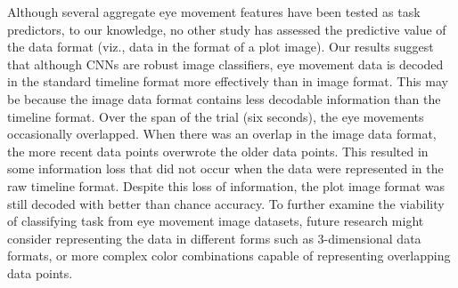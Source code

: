 \documentclass[
  english,
  man, donotrepeattitle,floatsintext]{apa6}
\begin{document}
Although several aggregate eye movement features have been tested as task predictors, to our knowledge, no other study has assessed the predictive value of the data format (viz., data in the format of a plot image). Our results suggest that although CNNs are robust image classifiers, eye movement data is decoded in the standard timeline format more effectively than in image format. This may be because the image data format contains less decodable information than the timeline format. Over the span of the trial (six seconds), the eye movements occasionally overlapped. When there was an overlap in the image data format, the more recent data points overwrote the older data points. This resulted in some information loss that did not occur when the data were represented in the raw timeline format. Despite this loss of information, the plot image format was still decoded with better than chance accuracy. To further examine the viability of classifying task from eye movement image datasets, future research might consider representing the data in different forms such as 3-dimensional data formats, or more complex color combinations capable of representing overlapping data points.
\end{document}

